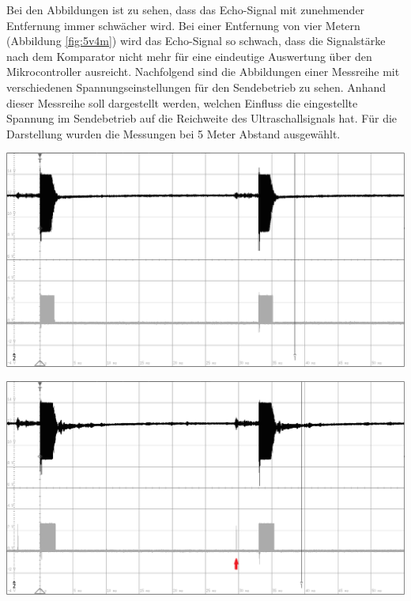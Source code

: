 Bei den Abbildungen ist zu sehen, dass das Echo-Signal mit zunehmender Entfernung immer schwächer wird. Bei einer Entfernung von vier Metern (Abbildung \ref{fig:5v4m}) wird das Echo-Signal so schwach, dass die Signalstärke nach dem Komparator nicht mehr für eine eindeutige Auswertung über den Mikrocontroller ausreicht. Nachfolgend sind die Abbildungen einer Messreihe mit verschiedenen Spannungseinstellungen für den Sendebetrieb zu sehen. Anhand dieser Messreihe soll dargestellt werden, welchen Einfluss die eingestellte Spannung im Sendebetrieb auf die Reichweite des Ultraschallsignals hat. Für die Darstellung wurden die Messungen bei 5 Meter Abstand ausgewählt.\\
\begin{minipage}{0.5\textwidth}
\includegraphics[width=1\textwidth%
]{Abbildungen/MessungenP2/5V/5m.PNG}
\label{fig:5v5m2}
\end{minipage}
\begin{minipage}{0.5\textwidth}
\includegraphics[width=1\textwidth%
]{Abbildungen/MessungenP2/10V/5mb.PNG}
\label{fig:10v5m}
\end{minipage}
